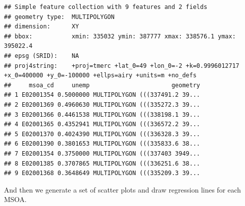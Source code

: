 \documentclass[]{book}
\newenvironment{Shaded}{\begin{snugshade}}{\end{snugshade}}
\newcommand{\KeywordTok}[1]{\textcolor[rgb]{0.13,0.29,0.53}{\textbf{#1}}}
\newcommand{\DataTypeTok}[1]{\textcolor[rgb]{0.13,0.29,0.53}{#1}}
\newcommand{\DecValTok}[1]{\textcolor[rgb]{0.00,0.00,0.81}{#1}}
\newcommand{\StringTok}[1]{\textcolor[rgb]{0.31,0.60,0.02}{#1}}
\newcommand{\CommentTok}[1]{\textcolor[rgb]{0.56,0.35,0.01}{\textit{#1}}}
\newcommand{\OperatorTok}[1]{\textcolor[rgb]{0.81,0.36,0.00}{\textbf{#1}}}
\newcommand{\NormalTok}[1]{#1}
\begin{document}
\begin{verbatim}
## Simple feature collection with 9 features and 2 fields
## geometry type:  MULTIPOLYGON
## dimension:      XY
## bbox:           xmin: 335032 ymin: 387777 xmax: 338576.1 ymax: 395022.4
## epsg (SRID):    NA
## proj4string:    +proj=tmerc +lat_0=49 +lon_0=-2 +k=0.9996012717 +x_0=400000 +y_0=-100000 +ellps=airy +units=m +no_defs
##     msoa_cd     unemp                       geometry
## 1 E02001354 0.5000000 MULTIPOLYGON (((337491.2 39...
## 2 E02001369 0.4960630 MULTIPOLYGON (((335272.3 39...
## 3 E02001366 0.4461538 MULTIPOLYGON (((338198.1 39...
## 4 E02001365 0.4352941 MULTIPOLYGON (((336572.2 39...
## 5 E02001370 0.4024390 MULTIPOLYGON (((336328.3 39...
## 6 E02001390 0.3801653 MULTIPOLYGON (((335833.6 38...
## 7 E02001354 0.3750000 MULTIPOLYGON (((337403 3949...
## 8 E02001385 0.3707865 MULTIPOLYGON (((336251.6 38...
## 9 E02001368 0.3648649 MULTIPOLYGON (((335209.3 39...
\end{verbatim}

\begin{Shaded}
\end{Shaded}

And then we generate a set of scatter plots and draw regression lines
for each MSOA.

\begin{Shaded}
\end{Shaded}
\end{document}

